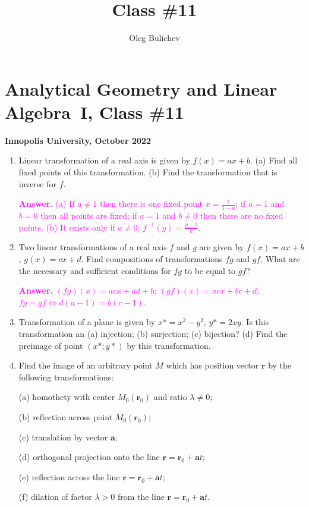 \documentclass[a4paper,10pt]{article}
\title{Class \#11}
\author{Oleg Bulichev}
\date{}
\begin{document}
\section*{Analytical Geometry and Linear Algebra~I, Class \#11}
\noindent\textbf{Innopolis University, October 2022}
\begin{enumerate}
\item Linear transformation of a real axis is given by $f(x)=ax+b$. (a) Find all fixed points of this transformation. (b) Find the transformation that is inverse for $f$.

\textcolor{magenta}{\textbf{Answer.} (a) If $a\neq1$ then there is one fixed point $x=\frac b{1-a}$; if $a=1$ and $b=0$ then all points are fixed; if $a=1$ and $b\neq0$ then there are no fixed points. (b) It exists only if $a\neq0$: $f^{-1}(y)=\frac{y-b}a$.}
    
\item Two linear transformations of a real axis $f$ and $g$ are given by $f(x)=ax+b$, $g(x)=cx+d$. Find compositions of transformations $fg$ and $gf$. What are the necessary and sufficient conditions for $fg$ to be equal to $gf$?
    
\textcolor{magenta}{\textbf{Answer.} $(fg)(x)=acx+ad+b$; $(gf)(x)=acx+bc+d$; $fg=gf\Leftrightarrow d(a-1)=b(c-1)$.}    
    
\item Transformation of a plane is given by $x*=x^2-y^2$, $y*=2xy$. Is this transformation an (a) injection; (b) surjection; (c) bijection? (d) Find the preimage of point $(x*;y*)$ by this transformation.
    
\item Find the image of an arbitrary point $M$ which has position vector $\textbf{r}$ by the following transformations:

(a) homothety with center $M_0(\textbf{r}_0)$ and ratio $\lambda\neq0$;

(b) reflection across point $M_0(\textbf{r}_0)$;

(c) translation by vector $\textbf{a}$;

(d) orthogonal projection onto the line $\textbf{r}=\textbf{r}_0+\textbf{a}t$;

(e) reflection across the line $\textbf{r}=\textbf{r}_0+\textbf{a}t$; 

(f) dilation of factor $\lambda>0$ from the line $\textbf{r}=\textbf{r}_0+\textbf{a}t$.


\end{enumerate}
\end{document}
